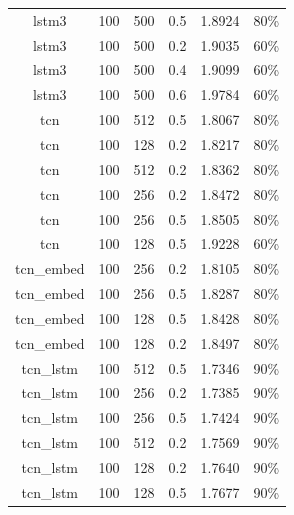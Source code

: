 \documentclass[12pt]{article}
\begin{document}
\begin{longtable}[c]{@{}>{\ttfamily}cccccc@{}}
	lstm3                & 100            & 500         & 0.5          & 1.8924   & 80\%  \\
	lstm3                & 100            & 500         & 0.2          & 1.9035   & 60\%  \\
	lstm3                & 100            & 500         & 0.4          & 1.9099   & 60\%  \\
	lstm3                & 100            & 500         & 0.6          & 1.9784   & 60\%  \\\midrule
	tcn                  & 100            & 512         & 0.5          & 1.8067   & 80\%  \\
	tcn                  & 100            & 128         & 0.2          & 1.8217   & 80\%  \\
	tcn                  & 100            & 512         & 0.2          & 1.8362   & 80\%  \\
	tcn                  & 100            & 256         & 0.2          & 1.8472   & 80\%  \\
	tcn                  & 100            & 256         & 0.5          & 1.8505   & 80\%  \\
	tcn                  & 100            & 128         & 0.5          & 1.9228   & 60\%  \\\midrule
	tcn\_embed           & 100            & 256         & 0.2          & 1.8105   & 80\%  \\
	tcn\_embed           & 100            & 256         & 0.5          & 1.8287   & 80\%  \\
	tcn\_embed           & 100            & 128         & 0.5          & 1.8428   & 80\%  \\
	tcn\_embed           & 100            & 128         & 0.2          & 1.8497   & 80\%  \\\midrule
	tcn\_lstm            & 100            & 512         & 0.5          & 1.7346   & 90\%  \\
	tcn\_lstm            & 100            & 256         & 0.2          & 1.7385   & 90\%  \\
	tcn\_lstm            & 100            & 256         & 0.5          & 1.7424   & 90\%  \\
	tcn\_lstm            & 100            & 512         & 0.2          & 1.7569   & 90\%  \\
	tcn\_lstm            & 100            & 128         & 0.2          & 1.7640   & 90\%  \\
	tcn\_lstm            & 100            & 128         & 0.5          & 1.7677   & 90\%  \\\midrule

\end{longtable}
\end{document}
